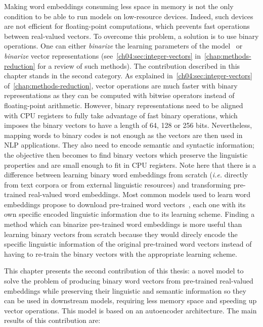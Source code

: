   Making word embeddings consuming less space in memory is not the only
  condition to be able to run models on low-resource devices. Indeed, such
  devices are not efficient for floating-point computations, which prevents fast
  operations between real-valued vectors. To overcome this problem, a solution
  is to use binary operations. One can either \textit{binarize} the learning
  parameters of the model~\citep{hubara2016binarized} or \textit{binarize}
  vector representations (see~\autoref{ch04:sec:integer-vectors}
  in~\autoref{chap:methods-reduction} for a review of such methods). The
  contribution described in this chapter stands in the second category. As
  explained in~\autoref{ch04:sec:integer-vectors}
  of~\autoref{chap:methods-reduction}, vector operations are much faster with
  binary representations as they can be computed with bitwise operators instead
  of floating-point arithmetic. However, binary representations need to be
  aligned with CPU registers to fully take advantage of fast binary operations,
  which imposes the binary vectors to have a length of 64, 128 or 256 bits.
  Nevertheless, mapping words to binary codes is not enough as the vectors are
  then used in NLP applications. They also need to encode semantic and syntactic
  information; the objective then becomes to find binary vectors which preserve
  the linguistic properties and are small enough to fit in CPU registers. Note
  here that there is a difference between learning binary word embeddings from
  scratch (\textit{i.e.} directly from text corpora or from external linguistic
  resources) and transforming pre-trained real-valued word embeddings. Most
  common models used to learn word embeddings propose to download pre-trained
  word vectors~\citep{mikolov2013distributed, pennington2014glove,
  bojanowski2016enriching, tissier2017dict2vec}, each one with its own specific
  encoded linguistic information due to its learning scheme. Finding a method
  which can binarize pre-trained word embeddings is more useful than learning
  binary vectors from scratch because they would direcly encode the specific
  linguistic information of the original pre-trained word vectors instead of
  having to re-train the binary vectors with the appropriate learning
  scheme.\medskip

  This chapter presents the second contribution of this thesis: a novel model to
  solve the problem of producing binary word vectors from pre-trained
  real-valued embeddings while preserving their linguistic and semantic
  information so they can be used in downstream models, requiring less memory
  space and speeding up vector operations. This model is based on an autoencoder
  architecture. The main results of this contribution are:

